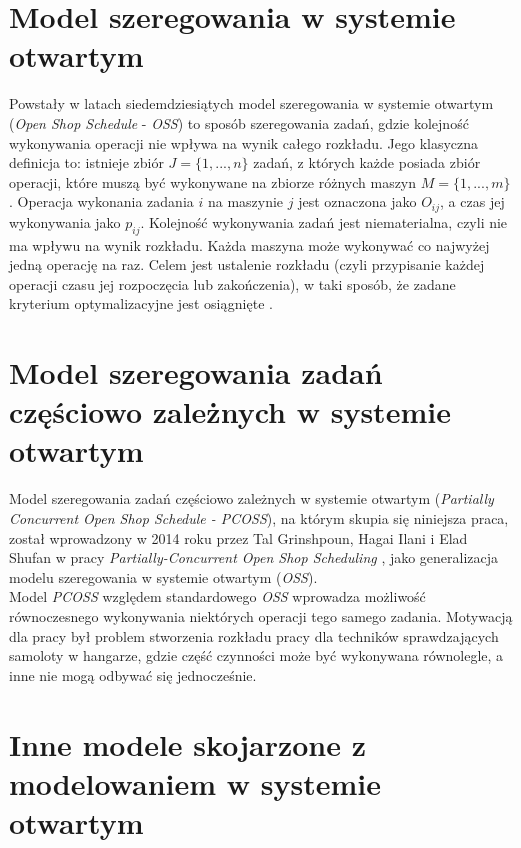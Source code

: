 \documentclass[brudnopis]{xmgr}
\begin{document}
\section{Model szeregowania w systemie otwartym}
\medskip

Powstały w latach siedemdziesiątych model szeregowania w systemie otwartym (\emph{Open Shop Schedule} - \emph{OSS}) to sposób szeregowania zadań, gdzie kolejność wykonywania operacji nie wpływa na wynik całego rozkładu. Jego klasyczna definicja to: istnieje zbiór $J=\{1, ..., n\}$ zadań, z których każde posiada zbiór operacji, które muszą być wykonywane na zbiorze różnych maszyn $M=\{1, ..., m\}$. Operacja wykonania zadania $i$ na maszynie $j$ jest oznaczona jako $O_{ij}$, a czas jej wykonywania jako $p_{ij}$.
Kolejność wykonywania zadań jest niematerialna, czyli nie ma wpływu na wynik rozkładu. Każda maszyna może wykonywać co najwyżej jedną operację na raz. Celem jest ustalenie rozkładu (czyli przypisanie każdej operacji czasu jej rozpoczęcia lub zakończenia), w taki sposób, że zadane kryterium optymalizacyjne jest osiągnięte \cite{ahmadian2020four}.


\section{Model szeregowania zadań częściowo zależnych w systemie otwartym}

Model szeregowania zadań częściowo zależnych w systemie otwartym (\emph{Partially Concurrent Open Shop Schedule - PCOSS}), na którym skupia się niniejsza praca, został wprowadzony w 2014 roku przez Tal Grinshpoun, Hagai Ilani i Elad Shufan w pracy \emph{Partially-Concurrent Open Shop Scheduling} \cite{grinshpoun2014partially}, jako generalizacja modelu szeregowania w systemie otwartym (\emph{OSS}).\\
Model \emph{PCOSS} względem standardowego \emph{OSS} wprowadza możliwość równoczesnego wykonywania niektórych operacji tego samego zadania. Motywacją dla pracy był problem stworzenia rozkładu pracy dla techników sprawdzających samoloty w hangarze, gdzie część czynności może być wykonywana równolegle, a inne nie mogą odbywać się jednocześnie.


\section{Inne modele skojarzone z modelowaniem w systemie otwartym}
\end{document}
